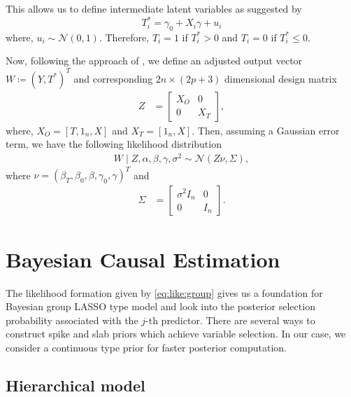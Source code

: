 \documentclass{amsart}
\newcommand{\normal}{\mathcal{N}}
\begin{document}
This allows us to define intermediate latent variables as suggested
by \citet{albert93}
\begin{equation}
	T_i^* = \gamma_0 + X_i\gamma +u_i
\end{equation}
where, $u_i\sim\mathcal{N}(0,1)$. Therefore, $T_i=1$ if $T_i^*>0$ and
$T_i=0$ if $T_i^*\le0$. 

Now, following the approach of \citet{koch2018}, we define an adjusted
output vector $W\coloneqq(Y, T^*)^T$ and corresponding $2n\times(2p+3)$ dimensional design matrix
\begin{align}
    Z &=
    \begin{bmatrix}
     X_O & 0 \\
     0 & X_T
    \end{bmatrix},
\end{align}
where, $X_O = [T, 1_n, X]$ and $X_T = [1_n, X]$. Then, assuming a
Gaussian error term, we have the following likelihood distribution
\begin{align}
W\mid Z, \alpha, \beta, \gamma, \sigma^2 \sim\normal\left(Z\nu, \Sigma\right)\label{eq:like:group},
\end{align}
where $\nu = (\beta_T, \beta_0, \beta, \gamma_0, \gamma)^T$ and
\begin{align}
\Sigma &=
\begin{bmatrix}
\sigma^2{I}_n & 0 \\
0 & {I}_n
\end{bmatrix}.
\end{align}


\section{Bayesian Causal Estimation}\label{sec:bayes}

The likelihood formation given by \cref{eq:like:group} gives us
a foundation for Bayesian group LASSO 
\cite{xu2015} type model and look into the posterior selection
probability associated with the $j$-th predictor. There are several
ways to construct spike and slab priors which achieve 
variable selection. In our case, we consider a continuous type
\cite{ishwaran2005} prior for faster posterior
computation.


\subsection{Hierarchical model}
\end{document}

